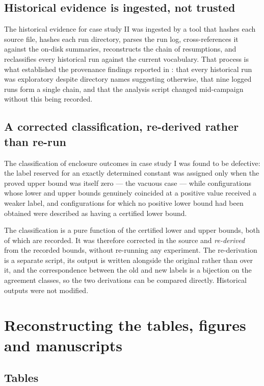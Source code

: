 \documentclass[11pt]{amsart}
\theoremstyle{remark}
\begin{document}
\subsection{Historical evidence is ingested, not trusted}

The historical evidence for case study II was ingested by a tool that hashes each source
file, hashes each run directory, parses the run log, cross-references it against the
on-disk summaries, reconstructs the chain of resumptions, and reclassifies every historical
run against the current vocabulary. That process is what established the provenance
findings reported in \cite{ChaveroJassoNumerical}: that every historical run was
exploratory despite directory names suggesting otherwise, that nine logged runs form a
single chain, and that the analysis script changed mid-campaign without this being
recorded.

\subsection{A corrected classification, re-derived rather than re-run}

The classification of enclosure outcomes in case study I was found to be defective: the
label reserved for an exactly determined constant was assigned only when the proved upper
bound was itself zero --- the vacuous case --- while configurations whose lower and upper
bounds genuinely coincided at a positive value received a weaker label, and configurations
for which no positive lower bound had been obtained were described as having a certified
lower bound.

The classification is a pure function of the certified lower and upper bounds, both of
which are recorded. It was therefore corrected in the source and \emph{re-derived} from the
recorded bounds, without re-running any experiment. The re-derivation is a separate script,
its output is written alongside the original rather than over it, and the correspondence
between the old and new labels is a bijection on the agreement classes, so the two
derivations can be compared directly. Historical outputs were not modified.

\section{Reconstructing the tables, figures and manuscripts}
\label{sec:reconstruct}

\subsection{Tables}
\end{document}
